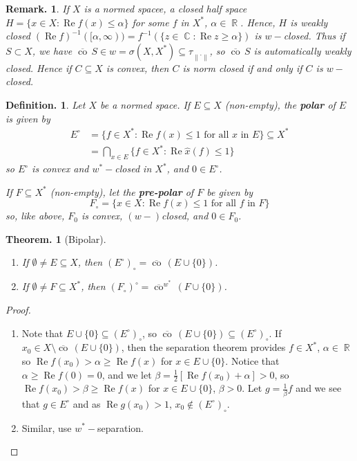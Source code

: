 \documentclass[11pt, a4paper]{memoir}
\DeclareMathOperator{\R}{{\mathbb{R}}}
\DeclareMathOperator{\C}{{\mathbb{C}}}
\newcommand{\norm}[1]{\ensuremath{\left\lVert#1\right\rVert}}
\theoremstyle{change}
\newtheorem{theorem}{Theorem.}[section]
\theoremstyle{plain}
\theoremstyle{nonumberplain}
\newtheorem{definition}{Definition.}
\newtheorem{remark}{Remark.}
\newtheorem{proof}{Proof}
\renewcommand{\Re}{\ensuremath{\operatorname{Re}}}
\newcommand{\cwx}{\ensuremath{\overline{\operatorname{co}}^{w^*}\,}}
\newcommand{\cw}{\ensuremath{\overline{\operatorname{co}}\,}}
\numberwithin{equation}{section}
\begin{document}
\begin{remark}
    If $X$ is a normed spacee, a closed half space $H=\{x\in X:\Re f(x)\leq\alpha\}$ for some $f$ in $X^*$, $\alpha\in\R$.
    Hence, $H$ is weakly closed $(\Re f)^{-1}([\alpha,\infty))=f^{-1}(\{z\in\C:\Re z\geq\alpha\})$ is $w-$closed.
    Thus if $S\subset X$, we have $\cw S\in w=\sigma(X,X^*)\subseteq\tau_{\norm{\cdot}}$, so $\cw S$ is automatically weakly closed.
    Hence if $C\subseteq X$ is convex, then $C$ is norm closed if and only if $C$ is $w-$closed.
\end{remark}
\begin{definition}
    Let $X$ be a normed space.
    If $E\subseteq X$ (non-empty), the \textbf{polar} of $E$ is given by
    \begin{align*}
        E^\circ&=\{f\in X^*:\Re f(x)\leq 1\text{ for all $x$ in }E\}\subseteq X^*\\
               &= \bigcap_{x\in E}\{f\in X^*:\Re\hat x(f)\leq 1\}
    \end{align*}
    so $E^\circ$ is convex and $w^*-$closed in $X^*$, and $0\in E^\circ$.

    If $F\subseteq X^*$ (non-empty), let the \textbf{pre-polar} of $F$ be given by
    \begin{equation*}
        F_\circ=\{x\in X:\Re f(x)\leq 1\text{ for all $f$ in }F\}
    \end{equation*}
    so, like above, $F_0$ is convex, $(w-)$closed, and $0\in F_0$.
\end{definition}
\begin{theorem}[Bipolar]
    \begin{enumerate}[nl,r]
        \item If $\emptyset\neq E\subseteq X$, then $(E^\circ)_\circ=\cw(E\cup\{0\})$.
        \item If $\emptyset\neq F\subseteq X^*$, then $(F_\circ)^\circ=\cwx(F\cup\{0\})$.
    \end{enumerate}
\end{theorem}
\begin{proof}
    \begin{enumerate}[nl,r]
        \item Note that $E\cup\{0\}\subseteq (E^\circ)_\circ$, so $\cw(E\cup\{0\})\subseteq(E^\circ)_\circ$.
            If $x_0\in X\setminus\cw(E\cup\{0\})$, then the separation theorem provides $f\in X^*$, $\alpha\in \R$ so $\Re f(x_0)>\alpha\geq\Re f(x)$ for $x\in E\cup\{0\}$.
            Notice that $\alpha\geq \Re f(0)=0$, and we let $\beta=\frac{1}{2}[\Re f(x_0)+\alpha]>0$, so $\Re f(x_0)>\beta\geq\Re f(x)$ for $x\in E\cup\{0\}$, $\beta>0$.
            Let $g=\frac{1}{\beta}f$ and we see that $g\in E^\circ$ and as $\Re g(x_0)>1$, $x_0\notin (E^\circ)_\circ$.
        \item Similar, use $w^*-$separation.
    \end{enumerate}
\end{proof}
\end{document}
